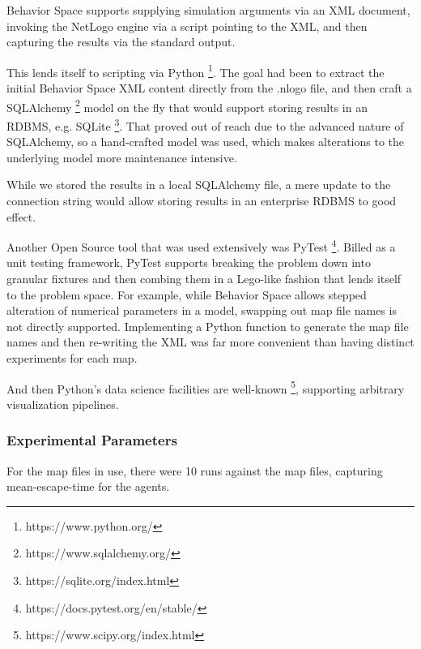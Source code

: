\documentclass[12pt,letterpaper]{article}
\begin{document}
Behavior Space supports supplying simulation arguments via an XML document,
invoking the NetLogo engine via a script pointing to the XML, and then capturing
the results via the standard output.

This lends itself to scripting via Python \footnote{https://www.python.org/}. The goal had been to extract the
initial Behavior Space XML content directly from the .nlogo file, and then craft
a SQLAlchemy \footnote{https://www.sqlalchemy.org/} model on the fly that would support storing results in an RDBMS,
e.g. SQLite \footnote{https://sqlite.org/index.html}. That proved out of reach due to the advanced nature of SQLAlchemy,
so a hand-crafted model was used, which makes alterations to the underlying
model more maintenance intensive.

While we stored the results in a local SQLAlchemy file, a mere update to the
connection string would allow storing results in an enterprise RDBMS to good
effect.

Another Open Source tool that was used extensively was PyTest \footnote{https://docs.pytest.org/en/stable/}. Billed as a
unit testing framework, PyTest supports breaking the problem down into granular
fixtures and then combing them in a Lego-like fashion that lends itself to the
problem space. For example, while Behavior Space allows stepped alteration of
numerical parameters in a model, swapping out map file names is not directly
supported. Implementing a Python function to generate the map file names and
then re-writing the XML was far more convenient than having distinct
experiments for each map.

And then Python's data science facilities are well-known \footnote{https://www.scipy.org/index.html}, supporting arbitrary
visualization pipelines.

\subsubsection{Experimental Parameters}
For the map files in use, there were 10 runs against the map files, capturing
mean-escape-time for the agents.
\end{document}
